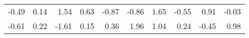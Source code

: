 \begin{center}\begin{tabular}{*{10}{D{.}{.}{2.2}}}
    -0.49 &      0.14 &      1.54 &      0.63 &     -0.87 &     -0.86 &      1.65 &     -0.55 &      0.91 &     -0.03 \\
    -0.61 &      0.22 &     -1.61 &      0.15 &      0.36 &      1.96 &      1.04 &      0.24 &     -0.45 &      0.98
\end{tabular}\end{center}